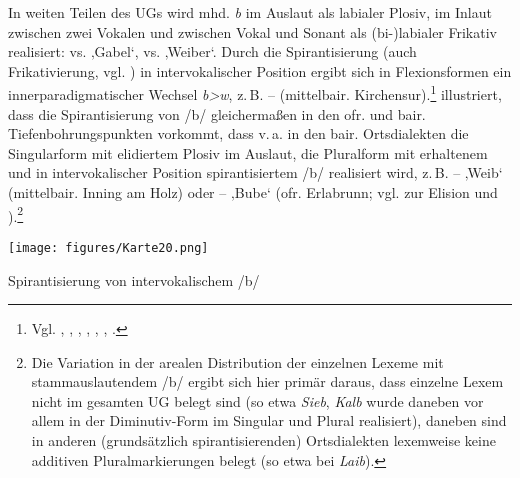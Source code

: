 \label{sec:7.1.2.3.3}
In weiten Teilen des UGs wird mhd. \textit{b} im Auslaut als labialer Plosiv, im Inlaut zwischen zwei Vokalen und zwischen Vokal und Sonant als (bi-)labialer Frikativ realisiert:  vs.  ‚Gabel‘,  vs.  ‚Weiber‘. Durch die Spirantisierung (auch Frikativierung, vgl. \citealt[197]{Streck2012}) in intervokalischer Position ergibt sich in Flexionsformen ein innerparadigmatischer Wechsel \textit{b>w}, z.\,B.  --  (mittelbair. Kirchensur).\footnote{Vgl. \citet[29f.]{Lessiak1933}, \citet[§25b/30b]{Kranzmayer1956}, \citet[69]{RennKönig2006}, \citet[79]{Rowley1997}, \citet[304]{Schirmunski1962}, \citet[218--219]{Steger1968}, \citet[453]{Wiesinger1990}.}  illustriert, dass die Spirantisierung von /b/ gleichermaßen in den ofr. und bair. Tiefenbohrungspunkten vorkommt, dass v.\,a. in den bair. Ortsdialekten die Singularform mit elidiertem Plosiv im Auslaut, die Pluralform mit erhaltenem und in intervokalischer Position spirantisiertem /b/ realisiert wird, z.\,B.  --  ‚Weib‘ (mittelbair. Inning am Holz) oder  --  ‚Bube‘ (ofr. Erlabrunn; vgl.  zur Elision und \citealt[§30b3]{Kranzmayer1956}).\footnote{Die Variation in der arealen Distribution der einzelnen Lexeme mit stammauslautendem /b/ ergibt sich hier primär daraus, dass einzelne Lexem nicht im gesamten UG belegt sind (so etwa \textit{Sieb}, \textit{Kalb} wurde daneben vor allem in der Diminutiv-Form im Singular und Plural realisiert), daneben sind in anderen (grundsätzlich spirantisierenden) Ortsdialekten lexemweise keine additiven Pluralmarkierungen belegt (so etwa bei \textit{Laib}).}


\begin{map}
\texttt{[image: figures/Karte20.png]}
\caption{Spirantisierung von intervokalischem /b/}
\label{map:20}
\end{map}

